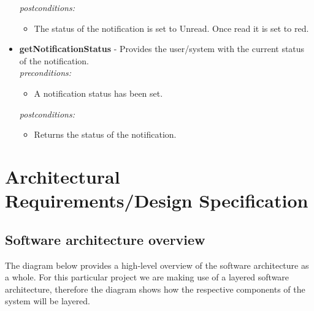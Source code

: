 \documentclass[a4paper,12pt]{article}
\begin{document}
\begin{itemize}
		\textit{postconditions:}
		\begin{itemize}
			\item The status of the notification is set to Unread. Once read it is set to red.\\[0.5cm]
		\end{itemize}
		
		\item \textbf{getNotificationStatus} -  Provides the user/system with the current status of the notification.\\[0.5cm]
		\textit{preconditions:}
		\begin{itemize}
			\item A notification status has been set.
		\end{itemize}
		
		\textit{postconditions:}
		\begin{itemize}
			\item Returns the status of the notification.\\[0.5cm]
		\end{itemize}
	\end{itemize}
	\newpage
	
	\section{Architectural Requirements/Design Specification}
	
	\subsection{Software architecture overview}
	
	The diagram below provides a high-level overview of the software architecture as a whole. For this particular project we are making use of a layered software architecture, therefore the diagram shows how the respective components of the system will be layered.\\
	
\end{document}

